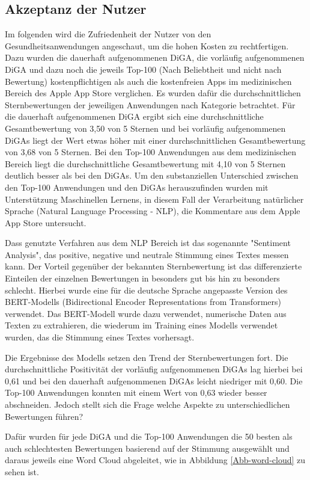\documentclass{article}
\begin{document}
		\subsection{Akzeptanz der Nutzer}
			Im folgenden wird die Zufriedenheit der Nutzer von den Gesundheitsanwendungen angeschaut, um die hohen Kosten zu rechtfertigen. Dazu wurden die dauerhaft aufgenommenen DiGA, die vorläufig aufgenommenen DiGA und dazu noch die jeweils Top-100 (Nach Beliebtheit und nicht nach Bewertung) kostenpflichtigen als auch die kostenfreien Apps im medizinischen Bereich des Apple App Store verglichen. Es wurden dafür die durchschnittlichen Sternbewertungen der jeweiligen Anwendungen nach Kategorie betrachtet. Für die dauerhaft aufgenommenen DiGA ergibt sich eine durchschnittliche Gesamtbewertung von 3,50 von 5 Sternen und bei vorläufig aufgenommenen DiGAs liegt der Wert etwas höher mit einer durchschnittlichen Gesamtbewertung von 3,68 von 5 Sternen. Bei den Top-100 Anwendungen aus dem medizinischen Bereich liegt die durchschnittliche Gesamtbewertung mit 4,10 von 5 Sternen deutlich besser als bei den DiGAs. Um den substanziellen Unterschied zwischen den Top-100 Anwendungen und den DiGAs herauszufinden wurden mit Unterstützung Maschinellen Lernens, in diesem Fall der Verarbeitung natürlicher Sprache (Natural Language Processing - NLP), die Kommentare aus dem Apple App Store untersucht.\par
			Dass genutzte Verfahren aus dem NLP Bereich ist das sogenannte "Sentiment Analysis", das positive, negative und neutrale Stimmung eines Textes messen kann. Der Vorteil gegenüber der bekannten Sternbewertung ist das differenzierte Einteilen der einzelnen Bewertungen in besonders gut bis hin zu besonders schlecht. Hierbei wurde eine für die deutsche Sprache angepasste Version des BERT-Modells (Bidirectional Encoder Representations from Transformers) verwendet. Das BERT-Modell wurde dazu verwendet, numerische Daten aus Texten zu extrahieren, die wiederum im Training eines Modells verwendet wurden, das die Stimmung eines Textes vorhersagt.\par
			Die Ergebnisse des Modells setzen den Trend der Sternbewertungen fort. Die durchschnittliche Positivität der vorläufig aufgenommenen DiGAs lag hierbei bei 0,61 und bei den dauerhaft aufgenommenen DiGAs leicht niedriger mit 0,60. Die Top-100 Anwendungen konnten mit einem Wert von 0,63 wieder besser abschneiden. Jedoch stellt sich die Frage welche Aspekte zu unterschiedlichen Bewertungen führen?\par
			Dafür wurden für jede DiGA und die Top-100 Anwendungen die 50 besten als auch schlechtesten Bewertungen basierend auf der Stimmung ausgewählt und daraus jeweils eine Word Cloud abgeleitet, wie in Abbildung \ref{Abb-word-cloud} zu sehen ist.
\end{document}
